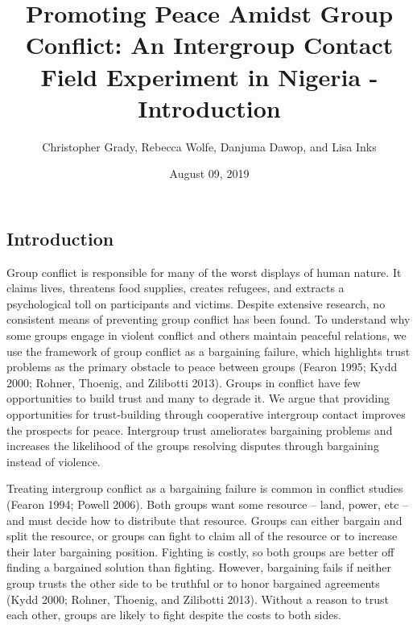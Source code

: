 \documentclass[11pt]{article}
\title{Promoting Peace Amidst Group Conflict: An Intergroup Contact Field
Experiment in Nigeria - Introduction}
\author{
Christopher Grady, Rebecca Wolfe, Danjuma Dawop, and Lisa Inks
}
\date{August 09, 2019}
\begin{document}
\VerbatimFootnotes

%
%
%
%
%
%
%
%
%
%

\maketitle

\hypertarget{introduction}{%
\subsection{Introduction}\label{introduction}}

Group conflict is responsible for many of the worst displays of human
nature. It claims lives, threatens food supplies, creates refugees, and
extracts a psychological toll on participants and victims. Despite
extensive research, no consistent means of preventing group conflict has
been found. To understand why some groups engage in violent conflict and
others maintain peaceful relations, we use the framework of group
conflict as a bargaining failure, which highlights trust problems as the
primary obstacle to peace between groups (Fearon 1995; Kydd 2000;
Rohner, Thoenig, and Zilibotti 2013). Groups in conflict have few
opportunities to build trust and many to degrade it. We argue that
providing opportunities for trust-building through cooperative
intergroup contact improves the prospects for peace. Intergroup trust
ameliorates bargaining problems and increases the likelihood of the
groups resolving disputes through bargaining instead of violence.

Treating intergroup conflict as a bargaining failure is common in
conflict studies (Fearon 1994; Powell 2006). Both groups want some
resource -- land, power, etc -- and must decide how to distribute that
resource. Groups can either bargain and split the resource, or groups
can fight to claim all of the resource or to increase their later
bargaining position. Fighting is costly, so both groups are better off
finding a bargained solution than fighting. However, bargaining fails if
neither group trusts the other side to be truthful or to honor bargained
agreements (Kydd 2000; Rohner, Thoenig, and Zilibotti 2013). Without a
reason to trust each other, groups are likely to fight despite the costs
to both sides.
\end{document}
